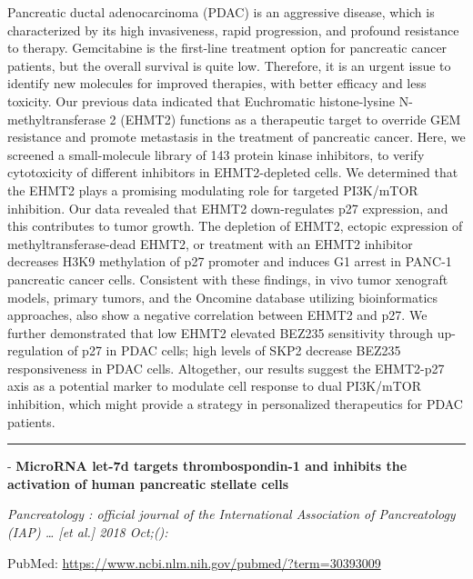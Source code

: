\documentclass[]{article}
\begin{document}
Pancreatic ductal adenocarcinoma (PDAC) is an aggressive disease, which
is characterized by its high invasiveness, rapid progression, and
profound resistance to therapy. Gemcitabine is the first-line treatment
option for pancreatic cancer patients, but the overall survival is quite
low. Therefore, it is an urgent issue to identify new molecules for
improved therapies, with better efficacy and less toxicity. Our previous
data indicated that Euchromatic histone-lysine N-methyltransferase 2
(EHMT2) functions as a therapeutic target to override GEM resistance and
promote metastasis in the treatment of pancreatic cancer. Here, we
screened a small-molecule library of 143 protein kinase inhibitors, to
verify cytotoxicity of different inhibitors in EHMT2-depleted cells. We
determined that the EHMT2 plays a promising modulating role for targeted
PI3K/mTOR inhibition. Our data revealed that EHMT2 down-regulates p27
expression, and this contributes to tumor growth. The depletion of
EHMT2, ectopic expression of methyltransferase-dead EHMT2, or treatment
with an EHMT2 inhibitor decreases H3K9 methylation of p27 promoter and
induces G1 arrest in PANC-1 pancreatic cancer cells. Consistent with
these findings, in vivo tumor xenograft models, primary tumors, and the
Oncomine database utilizing bioinformatics approaches, also show a
negative correlation between EHMT2 and p27. We further demonstrated that
low EHMT2 elevated BEZ235 sensitivity through up-regulation of p27 in
PDAC cells; high levels of SKP2 decrease BEZ235 responsiveness in PDAC
cells. Altogether, our results suggest the EHMT2-p27 axis as a potential
marker to modulate cell response to dual PI3K/mTOR inhibition, which
might provide a strategy in personalized therapeutics for PDAC patients.

{}

{}

\begin{center}\rule{0.5\linewidth}{\linethickness}\end{center}

 - \textbf{MicroRNA let-7d targets thrombospondin-1 and inhibits the
activation of human pancreatic stellate cells}

\emph{Pancreatology : official journal of the International Association
of Pancreatology (IAP) \ldots{} {[}et al.{]} 2018 Oct;():}

PubMed: \url{https://www.ncbi.nlm.nih.gov/pubmed/?term=30393009}
\end{document}

